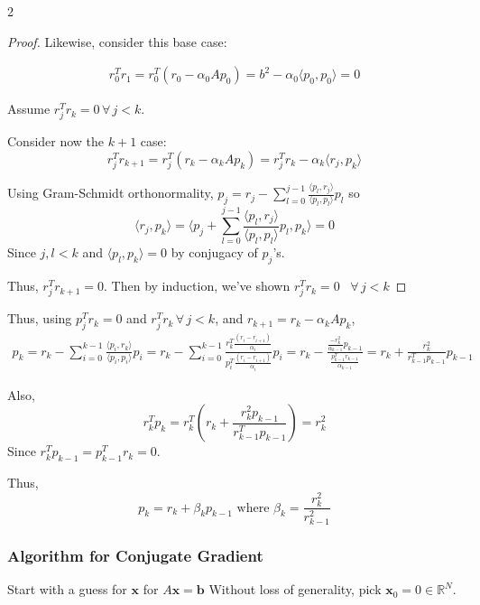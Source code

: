 \documentclass[10pt]{amsart}
\begin{document}
\begin{multicols*}{2}
\begin{proof}
Likewise, consider this base case:

\[
\begin{gathered}
	r_0^T r_1 = r_0^T (r_0 - \alpha_0 Ap_0) = b^2 - \alpha_0 \langle p_0 , p_0 \rangle = 0
\end{gathered}
\]

Assume $r_j^T r_k = 0\, \forall \, j < k$.

Consider now the $k+1$ case:
\[
r_j^T r_{k+1} = r_j^T (r_k - \alpha_k A p_k) = r_j^T r_k - \alpha_k \langle r_j, p_k \rangle 
\]

Using Gram-Schmidt orthonormality, $p_j = r_j - \sum_{l=0}^{j-1} \frac{ \langle p_l , r_j \rangle }{ \langle p_l , p_l \rangle } p_l$ so 
\[
\langle r_j , p_k \rangle = \langle p_j + \sum_{l=0}^{ j -1} \frac{ \langle p_l , r_j \rangle }{ \langle p_l , p_l \rangle } p_l , p_k \rangle = 0 
\]
Since $j, l < k$ and $\langle p_l, p_k \rangle = 0$ by conjugacy of $p_j$'s.

Thus, $r_j^T r_{k+1} =0$. Then by induction, we've shown $r_j^T r_k = 0$ \, $\forall \, j < k$

\end{proof}

Thus, using $p_j^T r_k = 0$ and $r_j^T r_k \, \forall\, j < k$, and $r_{k+1} = r_k - \alpha_k A p_k$,
\[
\begin{gathered}
p_k = r_k - \sum_{i=0}^{k-1} \frac{ \langle p_i, r_k \rangle }{ \langle p_i, p_i \rangle } p_i = r_k - \sum_{i=0}^{k-1} \frac{ r_k^T \frac{ (r_i - r_{i + 1} ) }{ \alpha_i } }{ p_i^T \frac{ (r_i - r_{i+1}) }{ \alpha_i} } p_i = r_k - \frac{ \frac{ -r_k^2 }{ \alpha_{k-1} } p_{k-1} }{ \frac{  p^T_{k-1} r_{k-1} }{ \alpha_{k-1}  } } = r_k + \frac{ r_k^2 }{ r^T_{k-1} p_{k-1} } p_{k-1}
\end{gathered}
\]

Also, 
\[
r_k^T p_k = r_k^T \left( r_k + \frac{ r_k^2 p_{k-1} }{ r_{k-1}^T p_{k-1} } \right) = r_k^2 
\]
Since $r_k^T p_{k-1} = p_{k-1}^T r_k = 0$.

Thus,
\begin{equation}
\boxed{ p_k = r_k + \beta_k p_{k-1} \text{ where } \beta_k = \frac{r_k^2 }{r_{k-1}^2} }
\end{equation}

\subsubsection{Algorithm for Conjugate Gradient}

Start with a guess for $\mathbf{x}$ for $A \mathbf{x} = \mathbf{b}$ Without loss of generality, pick $\mathbf{x}_0 = 0 \in \mathbb{R}^N$. \\


\end{multicols*}
\end{document}
